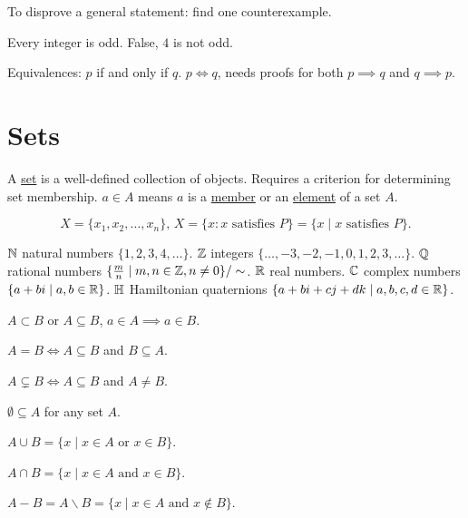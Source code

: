 \documentclass[]{article}
\begin{document}
To disprove a general statement: find one counterexample.

\begin{example}
	Every integer is odd. False, $4$ is not odd.
\end{example}

Equivalences: $p$ if and only if $q$. $p\Longleftrightarrow q$, needs proofs for both $p\implies q$ and $q\implies p$.

\section{Sets}

A \ul{set} is a well-defined collection of objects. Requires a criterion for determining set membership. $a\in A$ means $a$ is a \ul{member} or an \ul{element} of a set $A$.

$$X = \{ x_1,x_2,\dots,x_n\}, \, X = \{ x: x \text{ satisfies } P\} = \{x \mid x \text{ satisfies } P\}.$$

$\mathbb{N}$ natural numbers $\{1,2,3,4,\dots\}$.
$\mathbb{Z}$ integers $\{\dots,-3,-2,-1,0,1,2,3,\dots\}$.
$\mathbb{Q}$ rational numbers $\{\frac{m}{n} \mid m,n\in \mathbb{Z}, n\neq 0\}/\sim$.
$\mathbb{R}$ real numbers.
$\mathbb{C}$ complex numbers $\{a+bi \mid a,b\in\mathbb{R}\}$.
$\mathbb{H}$ Hamiltonian quaternions $\{a+bi+cj+dk \mid a,b,c,d\in\mathbb{R}\}$.

\begin{definition}
	[Subset] $A\subset B$ or $A\subseteq B$, $a\in A \implies a\in B$.
\end{definition}
\begin{definition}
	$A = B \Longleftrightarrow A \subseteq B$ and $B\subseteq A$.
\end{definition}

\begin{definition}
	 $A\subsetneq B \Longleftrightarrow A\subseteq B$ and $A\neq B$.
\end{definition}
\begin{definition}
	 $\emptyset \subseteq A$ for any set $A$.
\end{definition}

\begin{definition}
	[Union] $A\cup B = \{ x\mid x\in A \text{ or } x\in B\}$.
\end{definition}
\begin{definition}
	[Intersection] $A\cap B = \{x \mid x\in A\text{ and } x\in B\}$.
\end{definition}
\begin{definition}
	[Difference] $A-B = A\backslash B = \{x \mid x\in A \text{ and } x\notin B\}$.
\end{definition}
\end{document}
